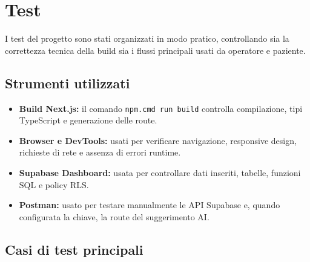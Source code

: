 \section{Test}

I test del progetto sono stati organizzati in modo pratico, controllando sia la correttezza tecnica
della build sia i flussi principali usati da operatore e paziente.

\subsection{Strumenti utilizzati}

\begin{itemize}
    \item \textbf{Build Next.js:} il comando \texttt{npm.cmd run build} controlla compilazione, tipi TypeScript e generazione delle route.
    \item \textbf{Browser e DevTools:} usati per verificare navigazione, responsive design, richieste di rete e assenza di errori runtime.
    \item \textbf{Supabase Dashboard:} usata per controllare dati inseriti, tabelle, funzioni SQL e policy RLS.
    \item \textbf{Postman:} usato per testare manualmente le API Supabase e, quando configurata la chiave, la route del suggerimento AI.
\end{itemize}

\subsection{Casi di test principali}

